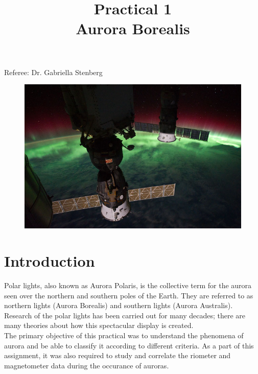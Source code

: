 \documentclass{article}
\title{Practical 1\\ Aurora Borealis} %
\author{\authors}
\begin{document}
\maketitle %

\centerline{Referee: Dr. Gabriella Stenberg}

\vspace{10mm}
\begin{figure}[h!]
\centering
\centerline{\includegraphics[width=\textwidth]{Figures/iss.jpg}}
\label{fig:iss}
\end{figure}

\setlength\parindent{0pt} %

\renewcommand{\labelenumi}{\alph{enumi}.} %
\clearpage

\tableofcontents

\listoffigures

\clearpage


\section{Introduction}
Polar lights, also known as Aurora Polaris, is the collective term for the aurora seen over the northern and southern poles of the Earth. They are referred to as northern lights (Aurora Borealis) and southern lights (Aurora Australis). Research of the polar lights has been carried out for many decades; there are many theories about how this spectacular display is created. \cite{Stenberg:2012ab}\\ 
The primary objective of this practical was to understand the phenomena of aurora and be able to classify it according to different criteria. As a part of this assignment, it was also required to study and correlate the riometer and magnetometer data during the occurance of auroras.
\end{document}
